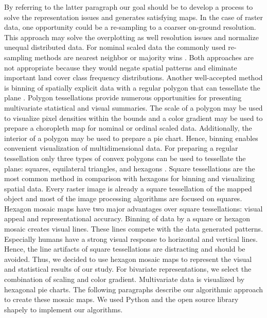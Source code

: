		By referring to the latter paragraph our goal should be to develop a process to solve the representation issues and generates satisfying maps. In the case of raster data, one opportunity could be a re-sampling to a coarser on-ground resolution. This approach may solve the overplotting as well resolution issues and normalize unequal distributed data. For nominal scaled data the commonly used re-sampling methods are nearest neighbor or majority wins . Both approaches are not appropriate because they would negate spatial patterns and eliminate important land cover class frequency distributions. Another well-accepted method is binning of spatially explicit data with a regular polygon that can tessellate the plane \citep{Carr1992}. Polygon tessellations provide numerous opportunities for presenting multivariate statistical and visual summaries. The scale of a polygon may be used to visualize pixel densities within the bounds and a color gradient may be used to prepare a choropleth map for nominal or ordinal scaled data. Additionally, the interior of a polygon may be used to prepare a pie chart. Hence, binning enables convenient visualization of multidimensional data. For preparing a regular tessellation only three types of convex polygons can be used to tessellate the plane: squares, equilateral triangles, and hexagons \citep{Carr1992}. Square tessellations are the most common method in comparison with hexagons for binning and visualizing spatial data. Every raster image is already a square tessellation of the mapped object and most of the image processing algorithms are focused on squares. Hexagon mosaic maps have two major advantages over square tessellations: visual appeal and representational accuracy. Binning of data by a square or hexagon mosaic creates visual lines. These lines compete with the data generated patterns. Especially humans have a strong visual response to horizontal and vertical lines. Hence, the line artifacts of square tessellations are distracting and should be avoided. Thus, we decided to use hexagon mosaic maps to represent the visual and statistical results of our study. For bivariate representations, we select the combination of scaling and color gradient. Multivariate data is visualized by hexagonal pie charts. The following paragraphs describe our algorithmic approach to create these mosaic maps. We used Python and the open source library shapely to implement our algorithms.

